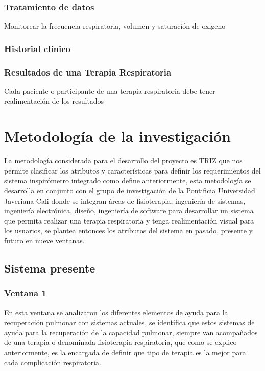 \documentclass[12pt]{article}
\begin{document}
\subsubsection{Tratamiento de datos}

Monitorear la frecuencia respiratoria, volumen y saturación de oxigeno



\subsubsection{Historial clínico}

\subsubsection{Resultados de una Terapia Respiratoria}

Cada paciente o participante de una terapia respiratoria debe tener realimentación de los resultados 



\section{Metodología de la investigación}

La metodología considerada para el desarrollo del proyecto es TRIZ que nos permite clasificar los atributos y características para definir los requerimientos del sistema inspirómetro integrado como define anteriormente, esta metodología se desarrolla en conjunto con el grupo de investigación de la Pontificia Universidad Javeriana Cali donde se integran áreas de fisioterapia, ingeniería de sistemas, ingeniería electrónica, diseño, ingeniería de software para desarrollar un sistema que permita realizar una terapia respiratoria y tenga realimentación visual para los usuarios, se plantea entonces los atributos del sistema en pasado, presente y futuro en nueve ventanas.


\subsection{Sistema presente} 

\subsubsection{Ventana 1}
En esta ventana se analizaron los diferentes elementos de ayuda para la recuperación pulmonar con sistemas actuales, se identifica que estos sistemas de ayuda para la recuperación de la capacidad pulmonar, siempre van acompañados de una terapia o denominada fisioterapia respiratoria, que como se explico anteriormente, es la encargada de definir que tipo de terapia es la mejor para cada complicación respiratoria.
\end{document}
